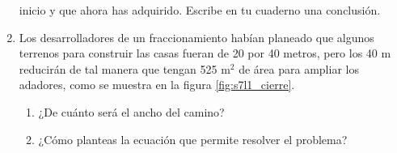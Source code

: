 \documentclass[11pt]{book}
\begin{document}
\begin{boxK}
\begin{minipage}[t]{0.8\textwidth}
\begin{enumerate}
                  inicio y que ahora has adquirido. Escribe en tu cuaderno una conclusión.
            \item Los desarrolladores de un fraccionamiento habían planeado que algunos
                  terrenos para construir las casas fueran de 20 por 40 metros, pero los
                  40 m
                  reducirán de tal manera que tengan 525 m$^2$ de área para ampliar los adadores, como se muestra en la figura \ref{fig:s7l1_cierre}.
                  \begin{enumerate}
                      \item ¿De cuánto será el ancho del camino?
                      \item ¿Cómo planteas la ecuación que permite resolver el problema?
                  \end{enumerate}
        \end{enumerate}
    \end{minipage}


\end{boxK}

\newpage
\end{document}
